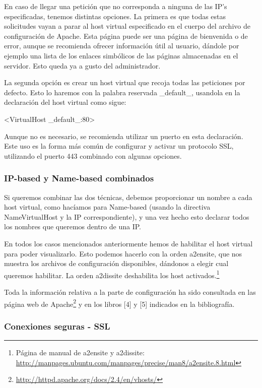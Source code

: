 \documentclass[a4paper, 10pt]{article} %
\begin{document}

En caso de llegar una petición que no corresponda a ninguna de las IP's especificadas, tenemos distintas opciones. La primera es que todas estas solicitudes vayan a parar al host virtual especificado en el cuerpo del archivo de configuración de Apache. Esta página puede ser una página de bienvenida o de error, aunque se recomienda ofrecer información útil al usuario, dándole por ejemplo una lista de los enlaces simbólicos de las páginas almacenadas en el servidor. Esto queda ya a gusto del administrador. 

La segunda opción es crear un host virtual que recoja todas las peticiones por defecto. Esto lo haremos con la palabra reservada \_default\_, usandola en la declaración del host virtual como sigue: 

<VirtualHost \_default\_:80> 

Aunque no es necesario, se recomienda utilizar un puerto en esta declaración. Este uso es la forma más común de configurar y activar un protocolo SSL, utilizando el puerto 443 combinado con algunas opciones.  

\subsubsection{IP-based y Name-based combinados}

Si queremos combinar las dos técnicas, debemos proporcionar un nombre a cada host virtual, como hacíamos para Name-based (usando la directiva NameVirtualHost y la IP correspondiente), y una vez hecho esto declarar todos los nombres que queremos dentro de una IP. 

En todos los casos mencionados anteriormente hemos de habilitar el host virtual para poder visualizarlo. Esto podemos hacerlo con la orden a2ensite, que nos muestra los archivos de configuración disponibles, dándonos a elegir cual queremos habilitar. La orden a2dissite deshabilita los host activados.\footnote{Página de manual de a2ensite y a2dissite: \url{http://manpages.ubuntu.com/manpages/precise/man8/a2ensite.8.html}}

Toda la información relativa a la parte de configuración ha sido consultada en las página web de Apache\footnote{\url{http://httpd.apache.org/docs/2.4/en/vhosts/}} y en los libros [4] y [5] indicados en la bibliografía. 

\subsubsection{Conexiones seguras - SSL}
\end{document}
